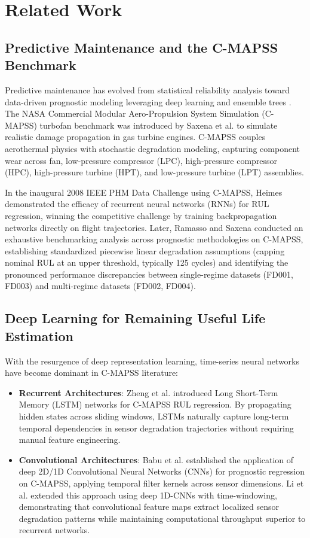 \section{Related Work}
\label{sec:related_work}

\subsection{Predictive Maintenance and the C-MAPSS Benchmark}
Predictive maintenance has evolved from statistical reliability analysis toward data-driven prognostic modeling leveraging deep learning and ensemble trees \cite{saxena2008damage}. The NASA Commercial Modular Aero-Propulsion System Simulation (C-MAPSS) turbofan benchmark was introduced by Saxena et al. \cite{saxena2008damage} to simulate realistic damage propagation in gas turbine engines. C-MAPSS couples aerothermal physics with stochastic degradation modeling, capturing component wear across fan, low-pressure compressor (LPC), high-pressure compressor (HPC), high-pressure turbine (HPT), and low-pressure turbine (LPT) assemblies.

In the inaugural 2008 IEEE PHM Data Challenge using C-MAPSS, Heimes \cite{heimes2008recurrent} demonstrated the efficacy of recurrent neural networks (RNNs) for RUL regression, winning the competitive challenge by training backpropagation networks directly on flight trajectories. Later, Ramasso and Saxena \cite{ramasso2014performance} conducted an exhaustive benchmarking analysis across prognostic methodologies on C-MAPSS, establishing standardized piecewise linear degradation assumptions (capping nominal RUL at an upper threshold, typically 125 cycles) and identifying the pronounced performance discrepancies between single-regime datasets (FD001, FD003) and multi-regime datasets (FD002, FD004).

\subsection{Deep Learning for Remaining Useful Life Estimation}
With the resurgence of deep representation learning, time-series neural networks have become dominant in C-MAPSS literature:
\begin{itemize}
    \item \textbf{Recurrent Architectures}: Zheng et al. \cite{zheng2017long} introduced Long Short-Term Memory (LSTM) networks for C-MAPSS RUL regression. By propagating hidden states across sliding windows, LSTMs naturally capture long-term temporal dependencies in sensor degradation trajectories without requiring manual feature engineering.
    \item \textbf{Convolutional Architectures}: Babu et al. \cite{babu2016deep} established the application of deep 2D/1D Convolutional Neural Networks (CNNs) for prognostic regression on C-MAPSS, applying temporal filter kernels across sensor dimensions. Li et al. \cite{li2018remaining} extended this approach using deep 1D-CNNs with time-windowing, demonstrating that convolutional feature maps extract localized sensor degradation patterns while maintaining computational throughput superior to recurrent networks.
\end{itemize}

